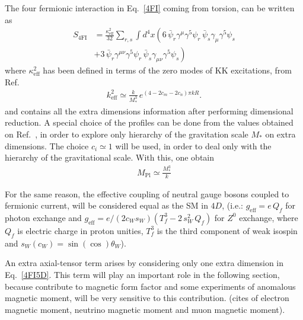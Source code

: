 The four fermionic interaction in Eq.~\eqref{4FI} coming from torsion, can be written as
\begin{align}
  \nonumber
  S_{4\text{FI}} &= \frac{\kappa_{\text{eff}}^2}{32}\sum_{r,s}\int d^4x\left(6\,\bar{\psi}_{r}\gamma^\mu\gamma^5\psi_{r}\,\bar{\psi}_{s}\gamma_\mu\gamma^5\psi_{s}\right.\\
  \label{4FI5D}
  &+\left. 3\,\bar{\psi}_r\gamma^{\mu\nu}\gamma^5\psi_r\,\bar{\psi}_s\gamma_{\mu\nu}\gamma^5\psi_s\right)
\end{align}
where $\kappa_{\text{eff}}^2$ has been defined in terms of the zero modes of KK excitations, from Ref.~\cite{Gherghetta:2000qt}
\begin{align}
  k_{\text{eff}}^2 \simeq \frac{k}{M_*^3}\,e^{(4-2c_m-2c_n)\pi kR}.
\end{align}
and contains all the extra dimensions information after performing dimensional reduction. A special choice of the profiles can be done from the values obtained on Ref.~\cite{Gherghetta:2006ha}, in order to explore only hierarchy of the gravitation scale $M_*$ on extra dimensions. The choice $c_i\simeq1$ will be used, in order to deal only with the hierarchy of the gravitational scale. With this, one obtain
\begin{align}
  M_{\text{Pl}} \simeq \frac{M_*^3}{k}
\end{align}

For the same reason, the effective coupling of neutral gauge bosons coupled to fermionic current, will be considered equal as the SM in $4D$, (i.e.: $g_{\text{eff}} = e\,Q_f$ for photon exchange and $g_{\text{eff}} = e/(2c_Ws_W)\left(T^3_f - 2\,s_W^2\,Q_f\right)$ for $Z^0$ exchange, where $Q_f$ is electric charge in proton unities, $T_f^3$ is the third component of weak isospin and $s_W(c_W) = \sin(\cos)\theta_W$). 

An extra axial-tensor term arises by considering only one extra dimension in Eq.~\eqref{4FI5D}. This term will play an important role in the following section, because contribute to magnetic form factor and some experiments of anomalous magnetic moment, will be very sensitive to this contribution. (cites of electron magnetic moment, neutrino magnetic moment and muon magnetic moment).


